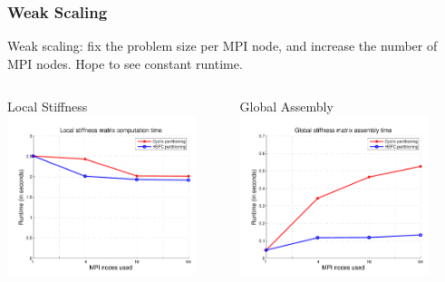 \documentclass[mathserif]{beamer}
\begin{document}
\begin{frame}
\frametitle{Weak Scaling}
Weak scaling: fix the problem size per MPI node, and increase the number of MPI nodes.  Hope to see constant runtime.
\begin{columns}[c]
\begin{column}{5.5cm}
\begin{block}{Local Stiffness}
\includegraphics[width=5.5cm]{../figs/scalingFigs/weakScalingLocal.pdf}
\end{block}
\end{column}
\begin{column}{5.5cm}
\begin{block}{Global Assembly}
\includegraphics[width=5.5cm]{../figs/scalingFigs/weakScalingAssembly.pdf}
\end{block}
\end{column}
\end{columns}
\end{frame}
\end{document}
